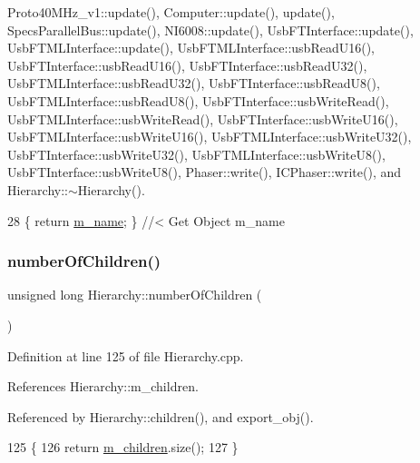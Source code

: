 Proto40\+M\+Hz\+\_\+v1\+::update(), Computer\+::update(), update(), Specs\+Parallel\+Bus\+::update(), N\+I6008\+::update(), Usb\+F\+T\+Interface\+::update(), Usb\+F\+T\+M\+L\+Interface\+::update(), Usb\+F\+T\+M\+L\+Interface\+::usb\+Read\+U16(), Usb\+F\+T\+Interface\+::usb\+Read\+U16(), Usb\+F\+T\+Interface\+::usb\+Read\+U32(), Usb\+F\+T\+M\+L\+Interface\+::usb\+Read\+U32(), Usb\+F\+T\+Interface\+::usb\+Read\+U8(), Usb\+F\+T\+M\+L\+Interface\+::usb\+Read\+U8(), Usb\+F\+T\+Interface\+::usb\+Write\+Read(), Usb\+F\+T\+M\+L\+Interface\+::usb\+Write\+Read(), Usb\+F\+T\+Interface\+::usb\+Write\+U16(), Usb\+F\+T\+M\+L\+Interface\+::usb\+Write\+U16(), Usb\+F\+T\+M\+L\+Interface\+::usb\+Write\+U32(), Usb\+F\+T\+Interface\+::usb\+Write\+U32(), Usb\+F\+T\+M\+L\+Interface\+::usb\+Write\+U8(), Usb\+F\+T\+Interface\+::usb\+Write\+U8(), Phaser\+::write(), I\+C\+Phaser\+::write(), and Hierarchy\+::$\sim$\+Hierarchy().


\begin{DoxyCode}
28 \{ \textcolor{keywordflow}{return} \hyperlink{classObject_a8b83c95c705d2c3ba0d081fe1710f48d}{m\_name}; \} \textcolor{comment}{//< Get Object m\_name}
\end{DoxyCode}
\mbox{\label{classHierarchy_ab16e84de65fd84e14001a6cf941c8be4}} 
\subsubsection{\texorpdfstring{number\+Of\+Children()}{numberOfChildren()}}
{\footnotesize\ttfamily unsigned long Hierarchy\+::number\+Of\+Children (\begin{DoxyParamCaption}{ }\end{DoxyParamCaption})\hspace{0.3cm}{\ttfamily [inherited]}}



Definition at line 125 of file Hierarchy.\+cpp.



References Hierarchy\+::m\+\_\+children.



Referenced by Hierarchy\+::children(), and export\+\_\+obj().


\begin{DoxyCode}
125                                            \{
126   \textcolor{keywordflow}{return} \hyperlink{classHierarchy_a038816763941fd4a930504917f60483b}{m\_children}.size();
127 \}
\end{DoxyCode}
\mbox{\label{classFEB__v1_a5b277ace76b9e511c055ad94d241dd61}} 
